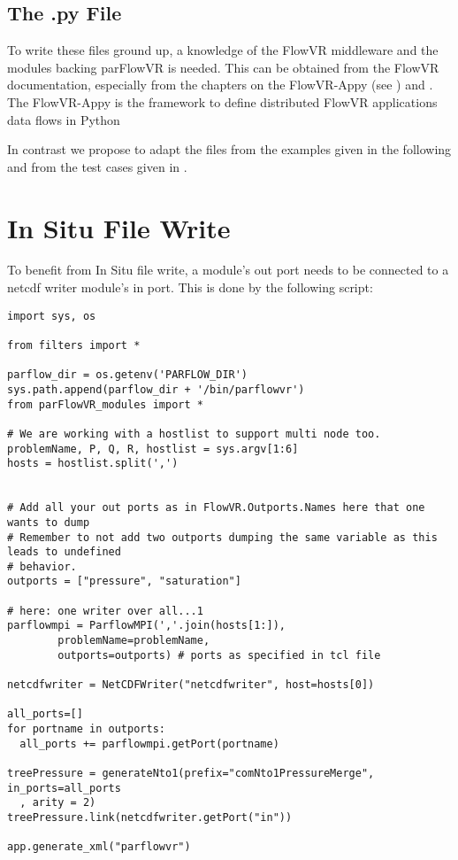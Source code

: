 \subsection{The .py File}
To write these files ground up, a knowledge of the FlowVR middleware and the modules backing
parFlowVR is needed. This can be obtained from the FlowVR documentation, especially from
the chapters on the FlowVR-Appy (see )
and \cite{thesisFriedemann2018}. The FlowVR-Appy is the framework to define distributed
FlowVR applications data flows in Python

In contrast we propose to adapt the  files from the examples given in the following
and from the test cases given in .
\section{In Situ File Write}
To benefit from In Situ file write, a \parflow{} module's out port needs to be connected to
a netcdf writer module's in port. This is done by the following  script:

\begin{display}\begin{verbatim}
import sys, os

from filters import *

parflow_dir = os.getenv('PARFLOW_DIR')
sys.path.append(parflow_dir + '/bin/parflowvr')
from parFlowVR_modules import *

# We are working with a hostlist to support multi node too.
problemName, P, Q, R, hostlist = sys.argv[1:6]
hosts = hostlist.split(',')


# Add all your out ports as in FlowVR.Outports.Names here that one wants to dump
# Remember to not add two outports dumping the same variable as this leads to undefined
# behavior.
outports = ["pressure", "saturation"]

# here: one writer over all...1
parflowmpi = ParflowMPI(','.join(hosts[1:]),
        problemName=problemName,
        outports=outports) # ports as specified in tcl file

netcdfwriter = NetCDFWriter("netcdfwriter", host=hosts[0])

all_ports=[]
for portname in outports:
  all_ports += parflowmpi.getPort(portname)

treePressure = generateNto1(prefix="comNto1PressureMerge", in_ports=all_ports
  , arity = 2)
treePressure.link(netcdfwriter.getPort("in"))

app.generate_xml("parflowvr")
\end{verbatim}\end{display}

